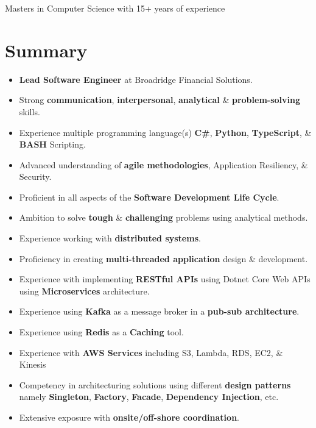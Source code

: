 \documentclass[letterpaper,9pt]{article}
\begin{document}
{\LARGE Masters in Computer Science with 15+ years of experience}

\section{Summary}
\begin{itemize}[itemsep=0.5em]
    \item \textbf{\color{black}Lead Software Engineer} at Broadridge Financial Solutions.
    \item Strong \textbf{\color{black}communication}, \textbf{\color{black}interpersonal}, \textbf{\color{black}analytical} \& \textbf{\color{black}problem-solving} skills.
    \item Experience multiple programming language(s) \textbf{\color{black}C\#}, \textbf{\color{black}Python}, \textbf{\color{black}TypeScript}, \& \textbf{\color{black}BASH} Scripting.
    \item Advanced understanding of \textbf{\color{black}agile methodologies}, Application Resiliency, \& Security.
    \item Proficient in all aspects of the \textbf{\color{black}Software Development Life Cycle}.
    \item Ambition to solve \textbf{\color{black}tough} \& \textbf{\color{black}challenging} problems using analytical methods.
    \item Experience working with \textbf{\color{black}distributed systems}.
    \item Proficiency in creating \textbf{\color{black}multi-threaded application} design \& development.
    \item Experience with implementing \textbf{\color{black}RESTful APIs} using Dotnet Core Web APIs using \textbf{\color{black}Microservices} architecture.
    \item Experience using \textbf{\color{black}Kafka} as a message broker in a \textbf{\color{black}pub-sub architecture}.
    \item Experience using \textbf{\color{black}Redis} as a \textbf{\color{black}Caching} tool.
    \item Experience with \textbf{\color{black}AWS Services} including S3, Lambda, RDS, EC2, \& Kinesis
    \item Competency in architecturing solutions using different \textbf{\color{black}design patterns} namely \textbf{\color{black}Singleton}, \textbf{\color{black}Factory}, \textbf{\color{black}Facade}, \textbf{\color{black}Dependency Injection}, etc.
    \item Extensive exposure with \textbf{\color{black}onsite/off-shore coordination}.

\end{itemize}
\end{document}
